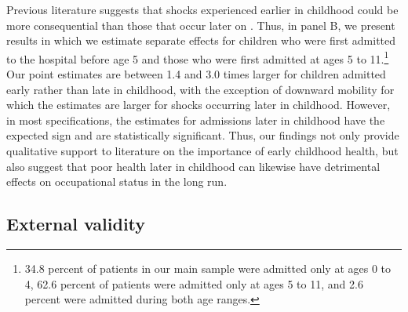 \documentclass[12pt,english]{article}
\begin{document}
Previous literature suggests that shocks experienced earlier in childhood could be more consequential than those that occur later on \citep{Heckman2006}. Thus, in panel B, we present results in which we estimate separate effects for children who were first admitted to the hospital before age 5 and those who were first admitted at ages 5 to 11.\footnote{34.8 percent of patients in our main sample were admitted only at ages 0 to 4, 62.6 percent of patients were admitted only at ages 5 to 11, and 2.6 percent were admitted during both age ranges.} Our point estimates are between 1.4 and 3.0 times larger for children admitted early rather than late in childhood, with the exception of downward mobility for which the estimates are larger for shocks occurring later in childhood. However, in most specifications, the estimates for admissions later in childhood have the expected sign and are statistically significant. Thus, our findings not only provide qualitative support to literature on the importance of early childhood health, but also suggest that poor health later in childhood can likewise have detrimental effects on occupational status in the long run.

\subsection[External validity]{External validity}\label{sec:External}
\end{document}
